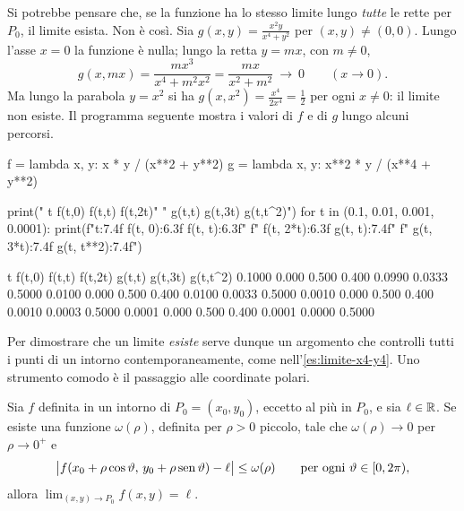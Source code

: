\begin{attenzione}
Si potrebbe pensare che, se la funzione ha lo stesso limite lungo \emph{tutte} le rette
per $P_{0}$, il limite esista. Non è così. Sia $g(x,y)=\frac{x^{2}y}{x^{4}+y^{2}}$ per
$(x,y)\neq(0,0)$. Lungo l'asse $x=0$ la funzione è nulla; lungo la retta $y=mx$, con
$m\neq0$,
\[
  g(x,mx)=\frac{mx^{3}}{x^{4}+m^{2}x^{2}}=\frac{mx}{x^{2}+m^{2}}\ \to\ 0 \qquad (x\to0).
\]
Ma lungo la parabola $y=x^{2}$ si ha $g(x,x^{2})=\frac{x^{4}}{2x^{4}}=\frac12$ per ogni
$x\neq0$: il limite non esiste. Il programma seguente mostra i valori di $f$ e di $g$
lungo alcuni percorsi.
\end{attenzione}

\begin{python}
f = lambda x, y: x * y / (x**2 + y**2)
g = lambda x, y: x**2 * y / (x**4 + y**2)

print("   t      f(t,0)  f(t,t)  f(t,2t)"
      "    g(t,t)  g(t,3t)  g(t,t^2)")
for t in (0.1, 0.01, 0.001, 0.0001):
    print(f"{t:7.4f}  {f(t, 0):6.3f}  {f(t, t):6.3f}"
          f"  {f(t, 2*t):6.3f}   {g(t, t):7.4f}"
          f"  {g(t, 3*t):7.4f}  {g(t, t**2):7.4f}")
\end{python}
\begin{risultato}
   t      f(t,0)  f(t,t)  f(t,2t)    g(t,t)  g(t,3t)  g(t,t^2)
 0.1000   0.000   0.500   0.400    0.0990   0.0333   0.5000
 0.0100   0.000   0.500   0.400    0.0100   0.0033   0.5000
 0.0010   0.000   0.500   0.400    0.0010   0.0003   0.5000
 0.0001   0.000   0.500   0.400    0.0001   0.0000   0.5000
\end{risultato}

Per dimostrare che un limite \emph{esiste} serve dunque un argomento che controlli tutti
i punti di un intorno contemporaneamente, come nell'\cref{es:limite-x4-y4}. Uno strumento
comodo è il passaggio alle coordinate polari.

\begin{proposizione}\label{prop:coordinate-polari}
Sia $f$ definita in un intorno di $P_{0}=(x_{0},y_{0})$, eccetto al più in $P_{0}$, e sia
$\ell\in\mathbb{R}$. Se esiste una funzione $\omega(\rho)$, definita per $\rho>0$ piccolo, tale che
$\omega(\rho)\to0$ per $\rho\to0^{+}$ e
\begin{equation}\label{eq:coordinate-polari}
  \bigl|f(x_{0}+\rho\cos\vartheta,\,y_{0}+\rho\operatorname{sen}\vartheta)-\ell\bigr|\le\omega(\rho)
  \qquad\text{per ogni }\vartheta\in[0,2\pi),
\end{equation}
allora $\lim_{(x,y)\to P_{0}}f(x,y)=\ell$.
\end{proposizione}

